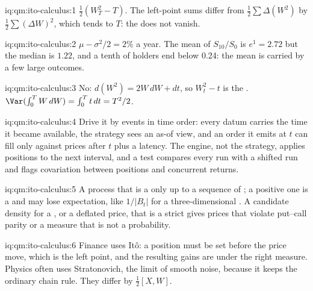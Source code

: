 \begin{solution}{iq:qm:ito-calculus:1}
$\tfrac12(W_T^2 - T)$. The left-point sums differ from $\tfrac12\sum\Delta(W^2)$ by $\tfrac12\sum(\Delta W)^2$,
which tends to $T$: the  does not vanish.
\end{solution}

\begin{solution}{iq:qm:ito-calculus:2}
$\mu - \sigma^2/2 = 2\%$ a year. The mean of $S_{10}/S_0$ is $e^{1} = 2.72$ but the median is $1.22$, and a
tenth of holders end below 0.24: the mean is carried by a few large outcomes.
\end{solution}

\begin{solution}{iq:qm:ito-calculus:3}
No: $d(W^2) = 2W\,dW + dt$, so $W_t^2 - t$ is the . $\Var(\int_0^TW\,dW) = \int_0^Tt\,dt =
T^2/2$.
\end{solution}

\begin{solution}{iq:qm:ito-calculus:4}
Drive it by events in time order: every datum carries the time it became available, the
strategy sees an as-of view, and an order it emits at $t$ can fill only against prices after
$t$ plus a latency. The engine, not the strategy, applies positions to the next interval, and
a test compares every run with a shifted run and flags covariation between positions and
concurrent returns.
\end{solution}

\begin{solution}{iq:qm:ito-calculus:5}
A process that is a  only up to a sequence of ; a positive one is a
 and may lose expectation, like $1/|B_t|$ for a three-dimensional .
A candidate density for a , or a deflated price, that is a strict  gives prices that violate put--call parity or a measure that is not a probability.
\end{solution}

\begin{solution}{iq:qm:ito-calculus:6}
Finance uses Itô: a position must be set before the price move, which is the left point, and
the resulting gains are  under the right measure. Physics often uses Stratonovich,
the limit of smooth noise, because it keeps the ordinary chain rule. They differ by $\tfrac12[X,W]$.
\end{solution}
